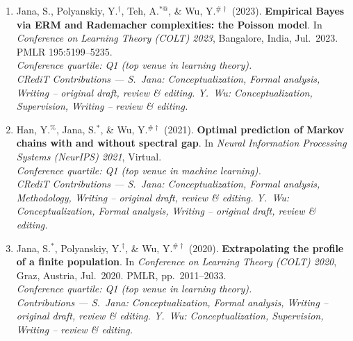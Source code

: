 \documentclass[letterpaper,oneside]{article}
\begin{document}
\begin{enumerate}[leftmargin=*,label=C\arabic*.]

  \item Jana, S., Polyanskiy, Y.$^{\dagger}$, Teh, A.$^{*@}$, \& Wu, Y.$^{\#\dagger}$ (2023). {\textbf{Empirical Bayes via ERM and Rademacher complexities: the Poisson model}}. In \textit{Conference on Learning Theory (COLT) 2023}, Bangalore, India, Jul.\ 2023. PMLR 195:5199--5235.\\
  \textit{Conference quartile: Q1 (top venue in learning theory).}\\
  \textit{CRediT Contributions --- S.~Jana: Conceptualization, Formal analysis, Writing -- original draft, review \& editing. Y.~Wu: Conceptualization, Supervision, Writing -- review \& editing.}

  \item Han, Y.$^\%$, Jana, S.$^*$, \& Wu, Y.$^{\#\dagger}$ (2021). {\textbf{Optimal prediction of Markov chains with and without spectral gap}}. In \textit{Neural Information Processing Systems (NeurIPS) 2021}, Virtual.\\
  \textit{Conference quartile: Q1 (top venue in machine learning).}
\\
\textit{CRediT Contributions --- S.~Jana: Conceptualization, Formal analysis, Methodology, Writing -- original draft, review \& editing. Y.~Wu: Conceptualization, Formal analysis, Writing -- original draft, review \& editing.}

  \item  Jana, S.$^*$, Polyanskiy, Y.$^{\dagger}$, \& Wu, Y.$^{\#\dagger}$ (2020). {\textbf{Extrapolating the profile of a finite population}}. In \textit{Conference on Learning Theory (COLT) 2020}, Graz, Austria, Jul.\ 2020. PMLR, pp.\ 2011--2033.\\
  \textit{Conference quartile: Q1 (top venue in learning theory).}\\
  \textit{Contributions --- S.~Jana: Conceptualization, Formal analysis, Writing -- original draft, review \& editing. Y.~Wu: Conceptualization, Supervision, Writing -- review \& editing.}

\end{enumerate}
%
%
%
%
%
%
%
%
%
\end{document}
